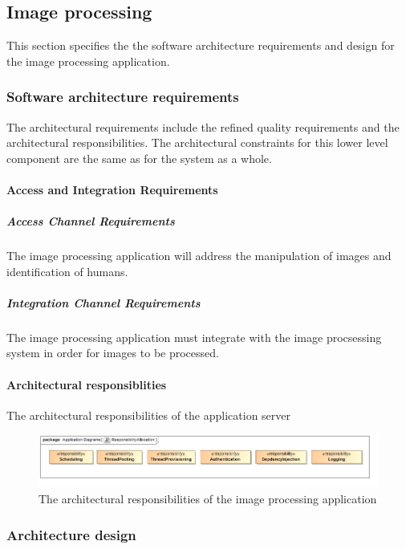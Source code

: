 \documentclass[a4paper,12pt]{report}
\begin{document}
	\subsection {Image processing}
	This section specifies the the software architecture requirements and design for the image processing application.
		\subsubsection {Software architecture requirements}
		The architectural requirements include the refined quality requirements and the architectural responsibilities. The architectural constraints for this lower level component are the same as for the system as a whole.
		
			\paragraph {Access and Integration Requirements}
				\subparagraph {Access Channel Requirements}
					The image processing application will address the manipulation of images and identification of humans.
				\subparagraph {Integration Channel Requirements}
					The  image processing application must integrate with the image procsessing system in order for images to be processed.	
			
			\FloatBarrier
			\paragraph {Architectural responsiblities}
				\hfill \break
				The architectural responsibilities of the 	application server
				\begin{figure}[H]
					\centering
					\includegraphics  [scale=0.5]{../Diagrams/applicationServerResponsibiltiesZ.png}
					\caption{The architectural responsibilities of the image processing application}
				\end{figure}		
		
		\subsubsection {Architecture design}	
			\FloatBarrier	
\end{document}
